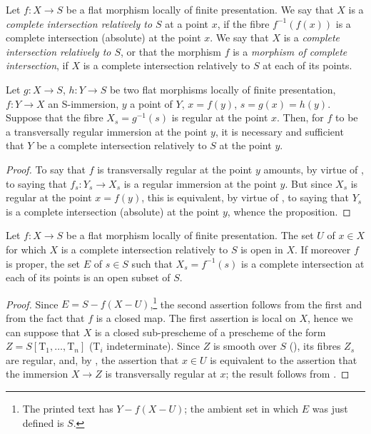 \begin{definition}[19.3.6]
\label{IV.19.3.6}
Let $f:X\to S$ be a flat morphism locally of finite presentation.
We say that $X$ is a \emph{complete intersection relatively to $S$} at a point $x$, if the fibre $f^{-1}(f(x))$ is a complete intersection (absolute) at the point $x$.
We say that $X$ is a \emph{complete intersection relatively to $S$}, or that the morphism $f$ is a \emph{morphism of complete intersection}, if $X$ is a complete intersection relatively to $S$ at each of its points.
\end{definition}

\begin{proposition}[19.3.7]
\label{IV.19.3.7}
Let $g:X\to S$, $h:Y\to S$ be two flat morphisms locally of finite presentation, $f:Y\to X$ an S-immersion, $y$ a point of $Y$, $x=f(y)$, $s=g(x)=h(y)$.
Suppose that the fibre $X_s=g^{-1}(s)$ is regular at the point $x$.
Then, for $f$ to be a transversally regular immersion at the point $y$, it is necessary and sufficient that $Y$ be a complete intersection relatively to $S$ at the point $y$.
\end{proposition}

\begin{proof}
To say that $f$ is transversally regular at the point $y$ amounts, by virtue of , to saying that $f_s:Y_s\to X_s$ is a regular immersion at the point $y$.
But since $X_s$ is regular at the point $x=f(y)$, this is equivalent, by virtue of , to saying that $Y_s$ is a complete intersection (absolute) at the point $y$, whence the proposition.
\end{proof}

\begin{corollary}[19.3.8]
\label{IV.19.3.8}
Let $f:X\to S$ be a flat morphism locally of finite presentation.
The set $U$ of $x\in X$ for which $X$ is a complete intersection relatively to $S$ is open in $X$.
If moreover $f$ is proper, the set $E$ of $s\in S$ such that $X_s=f^{-1}(s)$ is a complete intersection at each of its points is an open subset of $S$.
\end{corollary}

\begin{proof}
Since $E=S-f(X-U)$,\footnote{The printed text has $Y-f(X-U)$; the ambient set in which $E$ was just defined is $S$.} the second assertion follows from the first and from the fact that $f$ is a closed map.
The first assertion is local on $X$, hence we can suppose that $X$ is a closed sub-prescheme of a prescheme of the form $Z=S[\mathrm{T}_1,\ldots,\mathrm{T}_n]$ ($\mathrm{T}_i$ indeterminate).
Since $Z$ is smooth over $S$ (), its fibres $Z_s$ are regular, and, by , the assertion that $x\in U$ is equivalent to the assertion that the immersion $X\to Z$ is transversally regular at $x$; the result follows from .
\end{proof}

